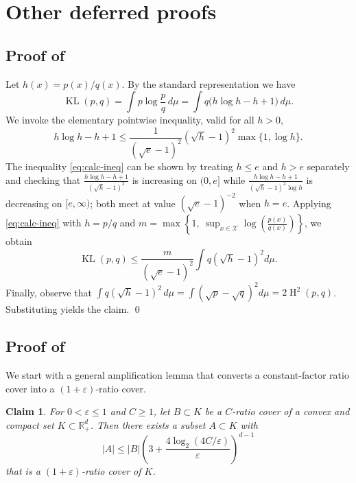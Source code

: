 \documentclass[11pt]{article}
\newcommand{\R}{\mathbb R}
\renewcommand{\le}{\leqslant}
\renewcommand{\ge}{\geqslant}
\newcommand{\eps}{\varepsilon}
\newcommand{\X}{\mathcal{X}}
\newcommand{\kl}{\operatorname{KL}}
\newcommand{\hel}{\operatorname{H}}
\newcommand{\hels}{\hel^2}
\newtheorem{claim}{Claim}
\theoremstyle{definition}
\theoremstyle{remark}
\begin{document}
\section{Other deferred proofs}
\label{sec:remainingproofs}
\subsection[Proof of Lemma~\ref{lem:kltohellinger}]{Proof of }

Let $h(x)={p(x)}/{q(x)}$. By the standard representation we have
\[
\kl(p,q)=\int p\log\frac{p}{q}\,d\mu
=\int q\bigl(h\log h-h+1\bigr)\,d\mu.
\]
We invoke the elementary pointwise inequality, valid for all $h>0$,
\begin{equation}\label{eq:calc-ineq}
h\log h-h+1 \le \frac{1}{(\sqrt{e}-1)^2}(\sqrt{h}-1)^2 \max\{1,\log h\}.
\end{equation}
The inequality \eqref{eq:calc-ineq} can be shown by treating $h\le e$ and $h> e$ separately and checking that
$\frac{h\log h-h+1}{(\sqrt{h}-1)^2}$ is increasing on $(0,e]$ while
$\frac{h\log h-h+1}{(\sqrt{h}-1)^2\log h}$ is decreasing on $[e,\infty)$; both meet at value $(\sqrt e-1)^{-2}$ when $h=e$. Applying \eqref{eq:calc-ineq} with $h=p/q$ and $m=\max\left\{1,\ \sup_{x\in\X}\log\left(\frac{p(x)}{q(x)}\right)\right\}$,
we obtain
\[
\kl(p,q) \le \frac{m}{(\sqrt{e}-1)^2}\int q(\sqrt{h}-1)^2d\mu.
\]
Finally, observe that $\int q(\sqrt{h}-1)^2\,d\mu=\int(\sqrt p-\sqrt q)^2d\mu=2\hels(p,q)$. Substituting yields the claim. \qed

\subsection[Proof of Corollary~\ref{cor:eps-pareto}]{Proof of }

We start with a general amplification lemma that converts a constant-factor ratio cover into a $(1+\eps)$-ratio cover.

\begin{claim}\label{claim:amplify-ratio}
For $0<\eps\le 1$ and $C \ge 1$, let $B \subset K$ be a $C$-ratio cover of a convex and compact set $K \subset \R_+^d$.
Then there exists a subset $A \subset K$ with
\[
|A|\le|B|\left(3 + \frac{4\log_2(4C/\eps)}{\eps}\right)^{d-1}
\]
that is a $(1+\eps)$-ratio cover of $K$.
\end{claim}
\end{document}
